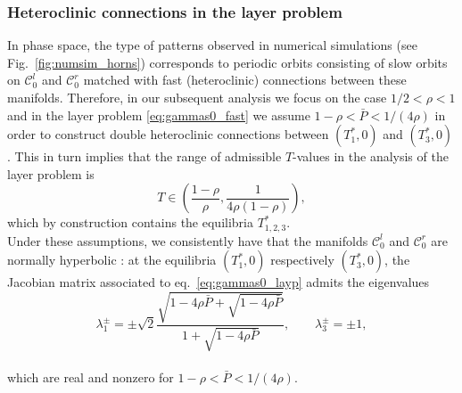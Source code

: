 \documentclass[a4paper,10pt,abstract=true,parskip=true]{scrartcl}
\theoremstyle{remark}
\numberwithin{equation}{section}
\numberwithin{thm}{section}
\begin{document}
\subsubsection{Heteroclinic connections in the layer problem}
In phase space, the type of patterns observed in numerical simulations (see Fig.~\ref{fig:numsim_horns}) corresponds to periodic orbits consisting of slow orbits on $\mathcal{C}_0^l$ and $\mathcal{C}_0^r$ matched with fast (heteroclinic) connections between these manifolds. Therefore, in our subsequent analysis we focus on the case $1/2 < \rho < 1$ and in the layer problem \eqref{eq:gammas0_fast} we assume $1-\rho < \bar{P} < 1/(4\rho)$ in order to construct double heteroclinic connections between $(T_1^\ast,0)$ and $(T_3^\ast,0)$. This in turn implies that the range of admissible $T$-values in the analysis of the layer problem is $$T \in \left(\frac{1-\rho}{\rho}, \frac{1}{4\rho(1-\rho)}\right),$$ which by construction contains the equilibria $T_{1,2,3}^\ast$.~\\
Under these assumptions, we consistently have that the manifolds $\mathcal{C}_0^l$ and $\mathcal{C}_0^r$ are normally hyperbolic \cite{Kuehn.2015}: at the equilibria $(T_1^\ast, 0 )$ respectively $(T_3^\ast, 0 )$, the Jacobian matrix associated to eq.~\eqref{eq:gammas0_layp} admits the eigenvalues
\[
\lambda_1^\pm = \pm \sqrt{2}\frac{\sqrt{1-4 \rho \bar{P} +\sqrt{1-4 \rho \bar{P} }}}{1+\sqrt{1-4 \rho \bar{P} }},
\qquad \lambda_3^\pm = \pm 1,
\]\\
which are real and nonzero for $1-\rho < \bar{P} < 1/(4\rho)$.
\end{document}
